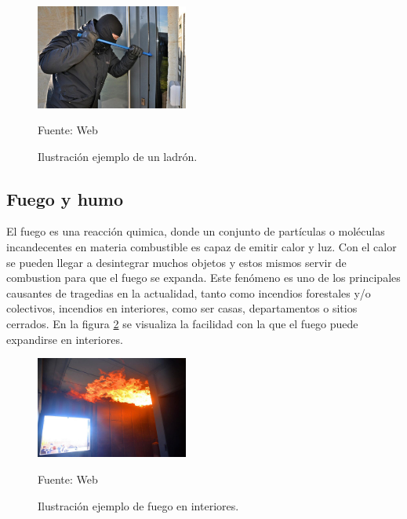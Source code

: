 \begin{figure}[H]
    \begin{center}
        \includegraphics[width=5cm]{img/capitulo_3/burglar.jpg}
    \end{center}
    \begin{center}
        \caption{Ilustración ejemplo de un ladrón.} 
        Fuente: Web
        \label{fig:ladron}
    \end{center}
\end{figure}

\subsection{Fuego y humo}
El fuego es una reacción quimica, donde un conjunto de partículas o moléculas incandecentes en materia combustible es capaz de emitir calor y luz. Con el calor se pueden llegar a desintegrar muchos objetos y estos mismos servir de combustion para que el fuego se expanda.
Este fenómeno es uno de los principales causantes de tragedias en la actualidad, tanto como incendios forestales y/o colectivos, incendios en interiores, como ser casas, departamentos o sitios cerrados. En la figura \ref{fig:fuego} se visualiza la facilidad con la que el fuego puede expandirse en interiores.\\

\begin{figure}[H]
    \begin{center}
        \includegraphics[width=5cm]{img/capitulo_3/fuego_en_interiores.jpg}
    \end{center}
    \begin{center}
        \caption{Ilustración ejemplo de fuego en interiores.} 
        Fuente: Web 
        \label{fig:fuego}
    \end{center}
\end{figure}

